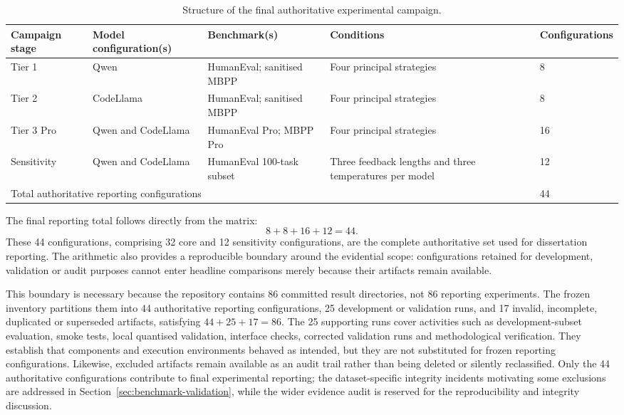 \begin{table}[htbp]
    \centering
    \caption{Structure of the final authoritative experimental campaign.}
    \label{tab:experimental-campaign}
    \footnotesize
    \renewcommand{\arraystretch}{1.15}
    \setlength{\tabcolsep}{3pt}
    \begin{tabular}{p{} p{} p{} p{} p{}}
        \hline
        \raggedright Campaign stage & \raggedright Model configuration(s) & \raggedright Benchmark(s) & \raggedright Conditions & \raggedright \scriptsize Configurations \tabularnewline
        \hline
        \raggedright Tier 1 & \raggedright Qwen & \raggedright HumanEval; sanitised MBPP & \raggedright Four principal strategies & \raggedright 8 \tabularnewline
        \raggedright Tier 2 & \raggedright CodeLlama & \raggedright HumanEval; sanitised MBPP & \raggedright Four principal strategies & \raggedright 8 \tabularnewline
        \raggedright Tier 3 Pro & \raggedright Qwen and CodeLlama & \raggedright HumanEval Pro; MBPP Pro & \raggedright Four principal strategies & \raggedright 16 \tabularnewline
        \raggedright Sensitivity & \raggedright Qwen and CodeLlama & \raggedright HumanEval 100-task subset & \raggedright Three feedback lengths and three temperatures per model & \raggedright 12 \tabularnewline
        \hline
        \multicolumn{4}{l}{Total authoritative reporting configurations} & \raggedright 44 \tabularnewline
        \hline
    \end{tabular}
\end{table}

The final reporting total follows directly from the matrix:
\[
8 + 8 + 16 + 12 = 44.
\]
These 44 configurations, comprising 32 core and 12 sensitivity configurations, are the complete authoritative set used for dissertation reporting. The arithmetic also provides a reproducible boundary around the evidential scope: configurations retained for development, validation or audit purposes cannot enter headline comparisons merely because their artifacts remain available.

This boundary is necessary because the repository contains 86 committed result directories, not 86 reporting experiments. The frozen inventory partitions them into 44 authoritative reporting configurations, 25 development or validation runs, and 17 invalid, incomplete, duplicated or superseded artifacts, satisfying $44+25+17=86$. The 25 supporting runs cover activities such as development-subset evaluation, smoke tests, local quantised validation, interface checks, corrected validation runs and methodological verification. They establish that components and execution environments behaved as intended, but they are not substituted for frozen reporting configurations. Likewise, excluded artifacts remain available as an audit trail rather than being deleted or silently reclassified. Only the 44 authoritative configurations contribute to final experimental reporting; the dataset-specific integrity incidents motivating some exclusions are addressed in Section~\ref{sec:benchmark-validation}, while the wider evidence audit is reserved for the reproducibility and integrity discussion.

